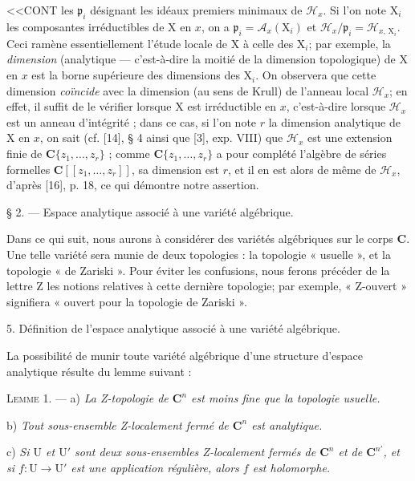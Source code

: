 <<CONT les $\mathfrak{p}_i$ désignant les idéaux premiers minimaux de $\mathcal{H}_x$. Si l'on note $\mathrm{X}_i$ les composantes irréductibles de $\mathrm{X}$ en $x$, on a $\mathfrak{p}_i = \mathcal{A}_x(\mathrm{X}_i)$ et $\mathcal{H}_x/\mathfrak{p}_i = \mathcal{H}_{x,\,\mathrm{X}_i}$. Ceci ramène essentiellement l'étude locale de $\mathrm{X}$ à celle des $\mathrm{X}_i$; par exemple, la \textit{dimension} (analytique --- c'est-à-dire la moitié de la dimension topologique) de $\mathrm{X}$ en $x$ est la borne supérieure des dimensions des $\mathrm{X}_i$. On observera que cette dimension \textit{coïncide} avec la dimension (au sens de Krull) de l'anneau local $\mathcal{H}_x$; en effet, il suffit de le vérifier lorsque $\mathrm{X}$ est irréductible en $x$, c'est-à-dire lorsque $\mathcal{H}_x$ est un anneau d'intégrité ; dans ce cas, si l'on note $r$ la dimension analytique de $\mathrm{X}$ en $x$, on sait (cf. [14], \S{} 4 ainsi que [3], exp. VIII) que $\mathcal{H}_x$ est une extension finie de $\mathbf{C}\{z_1, \ldots, z_r\}$ ; comme $\mathbf{C}\{z_1, \ldots, z_r\}$ a pour complété l'algèbre de séries formelles $\mathbf{C}[[z_1, \ldots, z_r]]$, sa dimension est $r$, et il en est alors de même de $\mathcal{H}_x$, d'après [16], p. 18, ce qui démontre notre assertion.


\S{} 2. --- Espace analytique associé à une variété algébrique.

Dans ce qui suit, nous aurons à considérer des variétés algébriques sur le corps $\mathbf{C}$. Une telle variété sera munie de deux topologies : la topologie « usuelle », et la topologie « de Zariski ». Pour éviter les confusions, nous ferons précéder de la lettre Z les notions relatives à cette dernière topologie; par exemple, « Z-ouvert » signifiera « ouvert pour la topologie de Zariski ».


5. Définition de l'espace analytique associé à une variété algébrique.

La possibilité de munir toute variété algébrique d'une structure d'espace analytique résulte du lemme suivant :

\textsc{Lemme} 1. --- a) \textit{La Z-topologie de $\mathbf{C}^n$ est moins fine que la topologie usuelle.}

b) \textit{Tout sous-ensemble Z-localement fermé de $\mathbf{C}^n$ est analytique.}

c) \textit{Si $\mathrm{U}$ et $\mathrm{U}'$ sont deux sous-ensembles Z-localement fermés de $\mathbf{C}^n$ et de $\mathbf{C}^{n'}$, et si $f : \mathrm{U} \to \mathrm{U}'$ est une application régulière, alors $f$ est holomorphe.}

